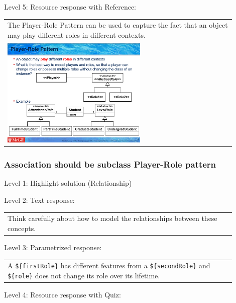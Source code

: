 \noindent Level 5: Resource response with Reference: \medskip

\begin{tabular}{|p{0.9\linewidth}}
The Player-Role Pattern can be used to capture the fact that an object may play different roles
in different contexts.

\\
\includegraphics[width=0.6\textwidth]{images/player_role.png}
\end{tabular} \medskip


\subsubsection{Association should be subclass Player-Role pattern}

\noindent Level 1: Highlight solution (Relationship) \medskip

\noindent Level 2: Text response: \medskip

\begin{tabular}{|p{0.9\linewidth}}
Think carefully about how to model the relationships between these concepts.
\end{tabular} \medskip

\noindent Level 3: Parametrized response: \medskip

\begin{tabular}{|p{0.9\linewidth}}
A \verb|${firstRole}| has different features from a \verb|${secondRole}| and \verb|${role}| does not change its role over its lifetime.
\end{tabular} \medskip

\noindent Level 4: Resource response with Quiz: \medskip


